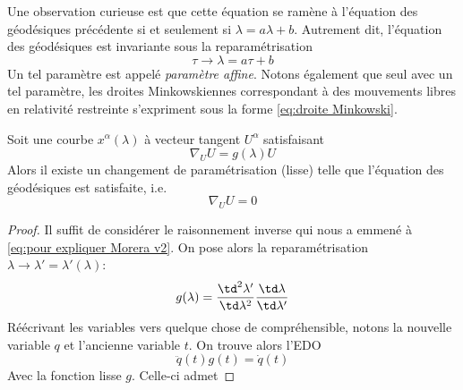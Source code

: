 Une observation curieuse est que cette équation se ramène à l'équation des géodésiques précédente si et seulement si $\lambda = a \lambda + b$. Autrement dit, l'équation des géodésiques est invariante sous la reparamétrisation
\begin{equation*}
    \tau \to \lambda = a\tau+b
\end{equation*}
Un tel paramètre est appelé \emph{paramètre affine}. Notons également que seul avec un tel paramètre, les droites Minkowskiennes correspondant à des mouvements libres en relativité restreinte s'expriment sous la forme \ref{eq:droite Minkowski}.
\begin{theoremframe}
    \begin{theorem}
        Soit une courbe $x^\alpha (\lambda)$ à vecteur tangent $U^\alpha$ satisfaisant 
        \begin{equation}
            \nabla_U U = g(\lambda) U
        \end{equation}
        Alors il existe un changement de paramétrisation (lisse) telle que l'équation des géodésiques est satisfaite, i.e.
    \begin{equation*}
        \nabla_U U = 0
    \end{equation*}
    \end{theorem}
\end{theoremframe}
\begin{proof}
    Il suffit de considérer le raisonnement inverse qui nous a emmené à \ref{eq:pour expliquer Morera v2}. On pose alors la reparamétrisation $\lambda \to \lambda' = \lambda'(\lambda)$:
    \begin{equation}
        g(\lambda) = \frac{\td^2 \lambda'}{\td \lambda^2} \frac{\td \lambda}{\td \lambda'}
    \end{equation}
    Réécrivant les variables vers quelque chose de compréhensible, notons la nouvelle variable $q$ et l'ancienne variable $t$. On trouve alors l'EDO
    \begin{equation}
        \ddot{q}(t) g(t) = \dot{q}(t)
    \end{equation}
    Avec la fonction lisse $g$. Celle-ci admet 
\end{proof}
